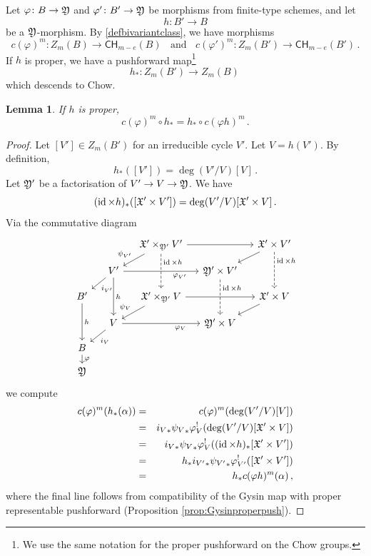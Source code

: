 \documentclass[a4paper,12pt]{article} %
\newcommand{\on}[1]{\operatorname{#1}}
\theoremstyle{definition}
\theoremstyle{plain}%
\newtheorem{lemma}[definition]{Lemma}
\renewcommand{\phi}{\varphi}
\newcommand{\Chow}{\mathsf{CH}}
\begin{document}
Let $\phi\colon B \to \frak Y$ and $\phi'\colon B' \to \frak Y$ be morphisms from finite-type schemes, and let 
$$h\colon B' \to B$$ be a $\frak Y$-morphism. By \cref{defbivariantclass}, we have morphisms
\[c(\phi)^{m} \colon Z_m(B) \to \Chow_{m-e}(B)
\ \ \ \
\text{and}
\ \ \ \
c(\phi')^{m} \colon Z_m(B') \to \Chow_{m-e}(B')\, . 
\]
If $h$ is proper, we have a pushforward map{\footnote{We use the same notation for the proper pushforward on the Chow groups.}}
\[h_*\colon Z_m(B') \to Z_m(B)\, \]
which descends to Chow.
\begin{lemma}\label{lem:C1proper}
If $h$ is proper, 
 $$c(\phi)^m\circ h_* = h_*\circ c(\phi h)^m\, . $$
\end{lemma} 
\begin{proof}
Let $[V']\in Z_m(B')$ for 
an irreducible cycle $V'$. Let $V = h(V')$. By definition, $$h_*([V']) = \deg(V'/V) [V]\, .$$ Let $\frak Y'$ be a factorisation of $V' \to V \to \frak Y$. We have 
$$(\on{id}\times h)_*([\frak X' \times V']) = \deg(V'/V) [\frak X' \times V]\, . $$ 
Via the commutative diagram
\begin{equation}
\begin{tikzcd}[column sep=small, row sep = small]
~ & ~ & \frak X' \times_{\frak Y'} V' 	\arrow[rr] \arrow[dd, dashed, near start, "\on{id} \times h"] \arrow[dl, swap, "\psi_{V'}"] & ~ & \frak X' \times V' \arrow[dl] \arrow[dd, dashed, near start, "\on{id} \times h"]\\
~ & V' \arrow[dl, "i_{V'}"] \arrow[rr, near end,swap, "\phi_{V'}"] \arrow[dd, "h"]& ~ & \frak Y' \times V' \arrow[dd, dashed, near start, "\on{id} \times h"] & ~ \\
 B' \arrow[dd, "h"] & ~ & \frak X' \times_{\frak Y'} V \arrow[dl, swap,"\psi_V"] 	\arrow[rr] & ~ & \frak X' \times V \arrow[dl] \\
~ & V \arrow[dl, "i_V"] \arrow[rr, near end, swap, "\phi_V"] &~ & \frak Y' \times V & ~ \\
B \arrow[d, "\phi"] &~ & ~ &~ & ~ \\
\frak Y &~ & ~ &~ & ~ 
\end{tikzcd}
\end{equation}
we compute
\begin{eqnarray*}
    c(\phi)^{m} (h_*(\alpha)) &=& c(\phi)^{m} (\deg(V'/V) [V])\\
    &=& {i_V}_* {\psi_V}_* \phi_V^! (\deg(V'/V) [\frak X' \times V]) \\
    &=& {i_V}_* {\psi_V}_* \phi_V^! ( (\on{id} \times h)_* [\frak X' \times V']) \\
    &=& h_* {i_{V'}}_* {\psi_{V'}}_* \phi_{V'}^! ( [\frak X' \times V'])    \\
    &=& h_* c(\phi h)^m(\alpha)\, ,
\end{eqnarray*}
where the final line follows from compatibility of the Gysin map with proper representable pushforward (Proposition \ref{prop:Gysinproperpush}). 
\end{proof}
\end{document}
